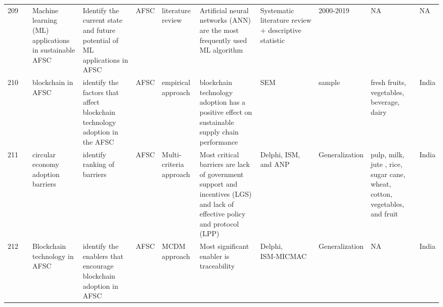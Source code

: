 \documentclass[a4paper,10pt]{article}
\begin{document}
\begin{landscape}
\begin{small}
\begin{longtable}{p{0.5cm} p{2cm} p{2.5cm} p{4cm} p{1cm} p{2.5cm} p{5.5cm} p{2.5cm} p{2.5cm} p{1.8cm} p{1.5cm}}
209 & \textcite{Sharma2020} & Machine learning (ML) applications in sustainable AFSC& Identify the current state and future potential of ML applications in AFSC & AFSC& literature review&Artificial neural networks (ANN) are the most frequently used ML algorithm&Systematic literature review + descriptive statistic & 2000‑2019& NA &  NA\\
210 & \textcite{Kirti2023} & blockchain in AFSC&identify the factors that affect blockchain technology adoption in the AFSC& AFSC & empirical approach& blockchain technology adoption  has a positive effect on sustainable supply chain performance  &SEM&sample & fresh fruits, vegetables, beverage, dairy & India\\
211 & \textcite{Shashank2021} & circular economy adoption barriers  &  identify ranking of barriers& AFSC & Multi-criteria approach& Most critical barriers are lack of government support and incentives (LGS) and lack of effective policy and protocol (LPP) &Delphi, ISM, and ANP&Generalization & pulp, milk, jute , rice, sugar cane, wheat, cotton, vegetables, and fruit & India \\
212 & \textcite{Sachin} &  Blockchain technology in AFSC& identify the enablers that encourage blockchain adoption in AFSC  & AFSC&MCDM approach& Most significant enabler is traceability&Delphi, ISM‑MICMAC &Generalization & NA & India \\
\end{longtable}
\endgroup
\end{small}
\end{landscape}
\printbibliography
\end{document}
